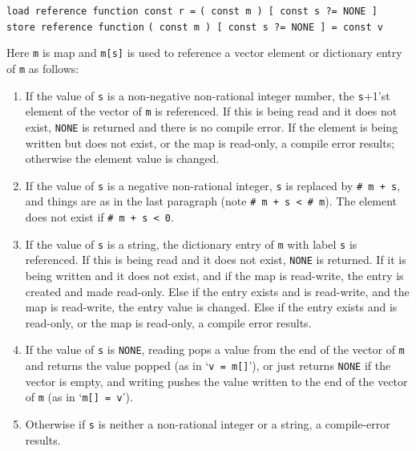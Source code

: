 \documentclass[12pt]{article}
\newenvironment{indpar}[1][0.3in]%
	{\begin{list}{}%
		     {\setlength{\itemsep}{0in}%
		      \setlength{\topsep}{0in}%
		      \setlength{\parsep}{1ex}%
		      \setlength{\labelwidth}{#1}%
		      \setlength{\leftmargin}{#1}%
		      \addtolength{\leftmargin}{\labelsep}}%
	 \item}%
	{\end{list}}
\begin{document}
{\tt load reference function const r =}
    {\tt ( const m ) [ const s ?=~NONE ]} \\
{\tt store reference function}
    {\tt ( const m ) [ const s ?=~NONE ] = const v}
\begin{indpar}
Here {\tt m} is map and {\tt m[s]} is used to reference a
vector element or dictionary entry of {\tt m} as follows:
\begin{enumerate}
\item If the value of {\tt s} is a non-negative non-rational integer number,
the {\tt s}+1'st element
of the vector of {\tt m} is referenced.  If this is being read and
it does not exist, {\tt NONE} is returned and there is no compile
error.
If the element is being written but does not exist, or the map
is read-only, a compile error results; otherwise the element
value is changed.
\item If the value of {\tt s} is a negative non-rational integer,
{\tt s} is replaced by {\tt \# m + s}, and things
are as in the last paragraph (note {\tt \# m + s < \# m}).  The element
does not exist if {\tt \# m + s < 0}.
\item If the value of {\tt s} is a string, the dictionary entry
of {\tt m} with label {\tt s} is referenced.  If this is being read and
it does not exist, {\tt NONE} is returned.  If it is being written and
it does not exist, and if the map is read-write,
the entry is created and made read-only.
Else if the entry exists and is read-write, and the map is read-write,
the entry value is changed.
Else if the entry exists and is read-only, or the map is read-only,
a compile error results.
\item If the value of {\tt s} is {\tt NONE}, reading pops a value from the
end of the vector
of {\tt m} and returns the value popped (as in `{\tt v = m[]}'),
or just returns {\tt NONE} if the vector is empty,
and writing pushes the value written to the end of the vector of {\tt m}
(as in `{\tt m[] = v}').
\item Otherwise if {\tt s} is neither a non-rational integer or a string,
a compile-error results.
\end{enumerate}
\end{indpar}
\end{document}
